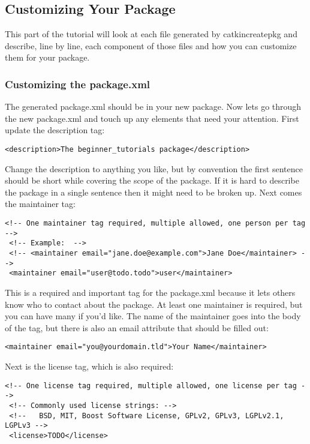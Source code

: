 \subsection{Customizing Your Package}
This part of the tutorial will look at each file generated by catkin\textunderscore create\textunderscore pkg and describe, line by line, each component of those files and how you can customize them for your package.

\subsubsection{Customizing the package.xml}
The generated package.xml should be in your new package. Now lets go through the new package.xml and touch up any elements that need your attention.
\newline
\newline
First update the description tag:

\begin{lstlisting}[breaklines=false languages=xml]
<description>The beginner_tutorials package</description>
\end{lstlisting}
Change the description to anything you like, but by convention the first sentence should be short while covering the scope of the package. If it is hard to describe the package in a single sentence then it might need to be broken up.
\newline
\pagebreak
\newpage
Next comes the maintainer tag:
\begin{lstlisting}[breaklines=true languages=xml]
 <!-- One maintainer tag required, multiple allowed, one person per tag --> 
 <!-- Example:  -->
 <!-- <maintainer email="jane.doe@example.com">Jane Doe</maintainer> -->
 <maintainer email="user@todo.todo">user</maintainer>
\end{lstlisting}

\noindent This is a required and important tag for the package.xml because it lets others know who to contact about the package. At least one maintainer is required, but you can have many if you'd like. The name of the maintainer goes into the body of the tag, but there is also an email attribute that should be filled out:

\begin{lstlisting}[breaklines=true languages=xml]
<maintainer email="you@yourdomain.tld">Your Name</maintainer>
\end{lstlisting}

\noindent Next is the license tag, which is also required:
\begin{lstlisting}[breaklines=true languages=xml]
 <!-- One license tag required, multiple allowed, one license per tag -->
 <!-- Commonly used license strings: -->
 <!--   BSD, MIT, Boost Software License, GPLv2, GPLv3, LGPLv2.1, LGPLv3 -->
 <license>TODO</license>
\end{lstlisting}

